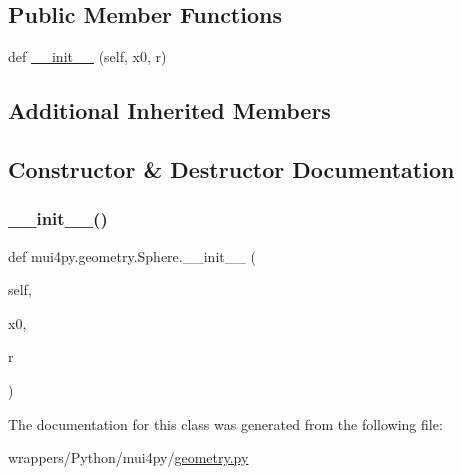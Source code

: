 \subsection*{Public Member Functions}
\begin{DoxyCompactItemize}
\item 
def \hyperlink{classmui4py_1_1geometry_1_1_sphere_af2fa58caf40d828061d3c357fc18fc7d}{\+\_\+\+\_\+init\+\_\+\+\_\+} (self, x0, r)
\end{DoxyCompactItemize}
\subsection*{Additional Inherited Members}


\subsection{Constructor \& Destructor Documentation}
\mbox{\label{classmui4py_1_1geometry_1_1_sphere_af2fa58caf40d828061d3c357fc18fc7d}} 
\subsubsection{\texorpdfstring{\+\_\+\+\_\+init\+\_\+\+\_\+()}{\_\_init\_\_()}}
{\footnotesize\ttfamily def mui4py.\+geometry.\+Sphere.\+\_\+\+\_\+init\+\_\+\+\_\+ (\begin{DoxyParamCaption}\item[{}]{self,  }\item[{}]{x0,  }\item[{}]{r }\end{DoxyParamCaption})}



The documentation for this class was generated from the following file\+:\begin{DoxyCompactItemize}
\item 
wrappers/\+Python/mui4py/\hyperlink{geometry_8py}{geometry.\+py}\end{DoxyCompactItemize}
